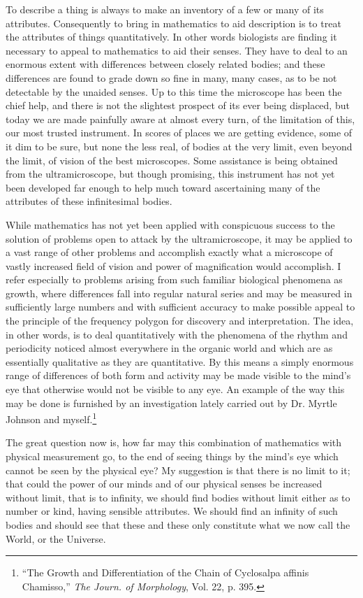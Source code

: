 \documentclass[a4paper, 11pt, oneside, polutonikogreek, english, landscape]{article}
\begin{document}
To describe a thing is always to make an inventory of a few or many of its attributes. Consequently to bring in mathematics to aid description is to treat the attributes of things quantitatively. In other words biologists are finding it necessary to appeal to mathematics to aid their senses. They have to deal to an enormous extent with differences between closely related bodies; and these differences are found to grade down so fine in many, many cases, as to be not detectable by the unaided senses. Up to this time the microscope has been the chief help, and there is not the slightest prospect of its ever being displaced, but today we are made painfully aware at almost every turn, of the limitation of this, our most trusted instrument. In scores of places we are getting evidence, some of it dim to be sure, but none the less real, of bodies at the very limit, even beyond the limit, of vision of the best microscopes. Some assistance is being obtained from the ultramicroscope, but though promising, this instrument has not yet been developed far enough to help much toward ascertaining many of the attributes of these infinitesimal bodies.

While mathematics has not yet been applied with conspicuous success to the solution of problems open to attack by the ultramicroscope, it may be applied to a vast range of other problems and accomplish exactly what a microscope of vastly increased field of vision and power of magnification would accomplish. I refer especially to problems arising from such familiar biological phenomena as growth, where differences fall into regular natural series and may be measured in sufficiently large numbers and with sufficient accuracy to make possible appeal to the principle of the frequency polygon for discovery and interpretation. The idea, in other words, is to deal quantitatively with the phenomena of the rhythm and periodicity noticed almost everywhere in the organic world and which are as essentially qualitative as they are quantitative. By this means a simply enormous range of differences of both form and activity may be made visible to the mind's eye that otherwise would not be visible to any eye. An example of the way this may be done is furnished by an investigation lately carried out by Dr. Myrtle Johnson and myself.\footnote{``The Growth and Differentiation of the Chain of Cyclosalpa affinis Chamisso,'' \emph{The Journ. of Morphology}, Vol. 22, p. 395.}

The great question now is, how far may this combination of mathematics with physical measurement go, to the end of seeing things by the mind's eye which cannot be seen by the physical eye? My suggestion is that there is no limit to it; that could the power of our minds and of our physical senses be increased without limit, that is to infinity, we should find bodies without limit either as to number or kind, having sensible attributes. We should find an infinity of such bodies and should see that these and these only constitute what we now call the World, or the Universe.
\end{document}
